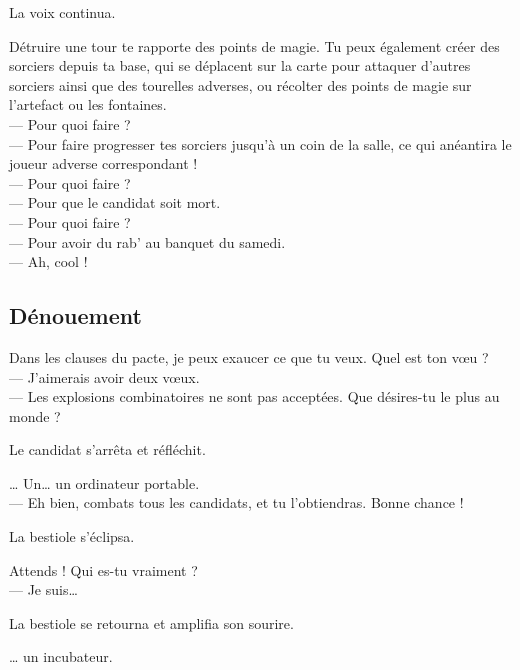 La voix continua.

\noindent
\og Détruire une tour te rapporte des points de magie. Tu peux également créer des sorciers depuis ta base, qui se déplacent sur la carte pour attaquer d'autres sorciers ainsi que des tourelles adverses, ou récolter des points de magie sur l'artefact ou les fontaines.\\
--- Pour quoi faire ?\\
--- Pour faire progresser tes sorciers jusqu'à un coin de la salle, ce qui anéantira le joueur adverse correspondant !\\
--- Pour quoi faire ?\\
--- Pour que le candidat soit mort.\\
--- Pour quoi faire ?\\
--- Pour avoir du rab' au banquet du samedi.\\
--- Ah, cool !\fg

\subsection{Dénouement}

\noindent
\og Dans les clauses du pacte, je peux exaucer ce que tu veux. Quel est ton vœu ?\\
--- J'aimerais avoir deux vœux.\\
--- Les explosions combinatoires ne sont pas acceptées. Que désires-tu le plus au monde ? \fg

Le candidat s'arrêta et réfléchit.

\noindent
\og … Un… un ordinateur portable.\\
--- Eh bien, combats tous les candidats, et tu l'obtiendras. Bonne chance ! \fg

La bestiole s'éclipsa.

\noindent
\og Attends ! Qui es-tu vraiment ?\\
--- Je suis… \fg

La bestiole se retourna et amplifia son sourire.

\noindent
\og … un incubateur. \fg